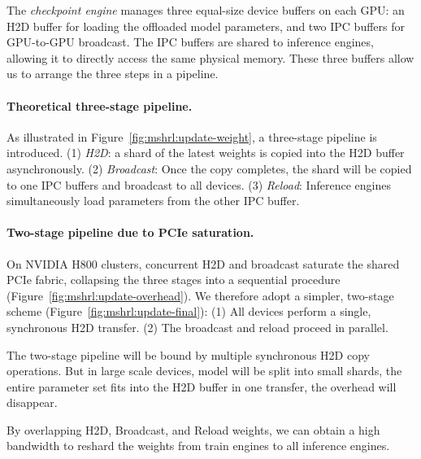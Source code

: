 The \emph{checkpoint engine} manages three equal-size device buffers on each GPU: an H2D buffer for loading the offloaded model parameters, and two IPC buffers for GPU-to-GPU broadcast.
The IPC buffers are shared to inference engines, allowing it to directly access the same physical memory.
 These three buffers allow us to arrange the three steps in a pipeline.
 
\paragraph{Theoretical three-stage pipeline.}  
As illustrated in Figure~\ref{fig:mshrl:update-weight}, a three-stage pipeline is introduced.
(1) \emph{H2D}: a shard of the latest weights is copied into the H2D buffer asynchronously.
(2) \emph{Broadcast}: Once the copy completes, the shard will be copied to one IPC buffers and broadcast to all devices.
(3) \emph{Reload}: Inference engines simultaneously load parameters from the other IPC buffer.

\paragraph{Two-stage pipeline due to PCIe saturation.}  
On NVIDIA H800 clusters, concurrent H2D and broadcast saturate the shared PCIe fabric, collapsing the three stages into a sequential procedure (Figure~\ref{fig:mshrl:update-overhead}).  
We therefore adopt a simpler, two-stage scheme (Figure~\ref{fig:mshrl:update-final}): (1) All devices perform a single, synchronous H2D transfer. (2) The broadcast and reload proceed in parallel.

The two-stage pipeline will be bound by multiple synchronous H2D copy operations. But in large scale devices, model will be split into small shards, the entire parameter set fits into the H2D buffer in one transfer, the overhead will disappear.

By overlapping H2D, Broadcast, and Reload weights, we can obtain a high bandwidth to reshard the weights from train engines to all inference engines.

